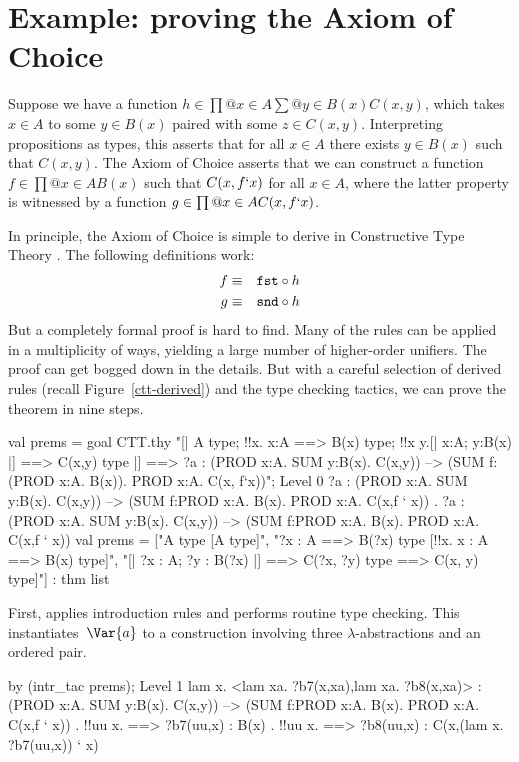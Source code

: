 \section{Example: proving the Axiom of Choice} \label{ctt-choice}
Suppose we have a function $h\in \prod@{x\in A}\sum@{y\in B(x)} C(x,y)$,
which takes $x\in A$ to some $y\in B(x)$ paired with some $z\in C(x,y)$.
Interpreting propositions as types, this asserts that for all $x\in A$
there exists $y\in B(x)$ such that $C(x,y)$.  The Axiom of Choice asserts
that we can construct a function $f\in \prod@{x\in A}B(x)$ such that
$C(x,f{\tt`}x)$ for all $x\in A$, where the latter property is witnessed by a
function $g\in \prod@{x\in A}C(x,f{\tt`}x)$.

In principle, the Axiom of Choice is simple to derive in Constructive Type
Theory \cite[page~50]{martinlof84}.  The following definitions work:
\begin{eqnarray*}
    f & \equiv & {\tt fst} \circ h \\
    g & \equiv & {\tt snd} \circ h
\end{eqnarray*}
But a completely formal proof is hard to find.  Many of the rules can be
applied in a multiplicity of ways, yielding a large number of higher-order
unifiers.  The proof can get bogged down in the details.  But with a
careful selection of derived rules (recall Figure~\ref{ctt-derived}) and
the type checking tactics, we can prove the theorem in nine steps.
\begin{ttbox}
val prems = goal CTT.thy
    "[| A type;  !!x. x:A ==> B(x) type;              \ttback
\ttback       !!x y.[| x:A;  y:B(x) |] ==> C(x,y) type      \ttback
\ttback    |] ==> ?a :    (PROD x:A. SUM y:B(x). C(x,y))    \ttback
\ttback               --> (SUM f: (PROD x:A. B(x)). PROD x:A. C(x, f`x))";
{\out Level 0}
{\out ?a : (PROD x:A. SUM y:B(x). C(x,y)) -->}
{\out      (SUM f:PROD x:A. B(x). PROD x:A. C(x,f ` x))}
{. ?a : (PROD x:A. SUM y:B(x). C(x,y)) -->}
{\out          (SUM f:PROD x:A. B(x). PROD x:A. C(x,f ` x))}
\ttbreak
{\out val prems = ["A type  [A type]",}
{\out              "?x : A ==> B(?x) type  [!!x. x : A ==> B(x) type]",}
{\out              "[| ?x : A; ?y : B(?x) |] ==> C(?x, ?y) type}
{\out               [!!x y. [| x : A; y : B(x) |] ==> C(x, y) type]"]}
{\out             : thm list}
\end{ttbox}
First,  applies introduction rules and performs routine
type checking.  This instantiates~$\Var{a}$ to a construction involving
three $\lambda$-abstractions and an ordered pair.
\begin{ttbox}
by (intr_tac prems);
{\out Level 1}
{\out lam x. <lam xa. ?b7(x,xa),lam xa. ?b8(x,xa)>}
{\out : (PROD x:A. SUM y:B(x). C(x,y)) -->}
{\out   (SUM f:PROD x:A. B(x). PROD x:A. C(x,f ` x))}
\ttbreak
{. !!uu x.}
{ ==>}
{\out        ?b7(uu,x) : B(x)}
\ttbreak
{. !!uu x.}
{ ==>}
{\out        ?b8(uu,x) : C(x,(lam x. ?b7(uu,x)) ` x)}
\end{ttbox}
